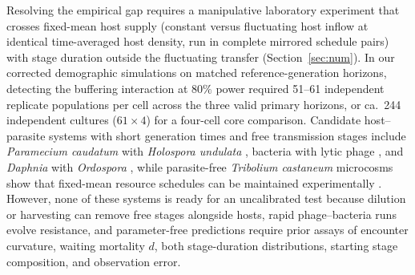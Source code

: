 Resolving the empirical gap requires a manipulative laboratory experiment that crosses fixed-mean host supply (constant versus fluctuating host inflow at identical time-averaged host density, run in complete mirrored schedule pairs) with stage duration outside the fluctuating transfer (Section~\ref{sec:num}). In our corrected demographic simulations on matched reference-generation horizons, detecting the buffering interaction at $80\%$ power required 51--61 independent replicate populations per cell across the three valid primary horizons, or ca.\ 244 independent cultures ($61 \times 4$) for a four-cell core comparison. Candidate host--parasite systems with short generation times and free transmission stages include \textit{Paramecium caudatum} with \textit{Holospora undulata} \citep{duncan2013}, bacteria with lytic phage \citep{harrison2013}, and \textit{Daphnia} with \textit{Ordospora} \citep{krichel2023}, while parasite-free \textit{Tribolium castaneum} microcosms show that fixed-mean resource schedules can be maintained experimentally \citep{desharnais2023}. However, none of these systems is ready for an uncalibrated test because dilution or harvesting can remove free stages alongside hosts, rapid phage--bacteria runs evolve resistance, and parameter-free predictions require prior assays of encounter curvature, waiting mortality $d$, both stage-duration distributions, starting stage composition, and observation error.
